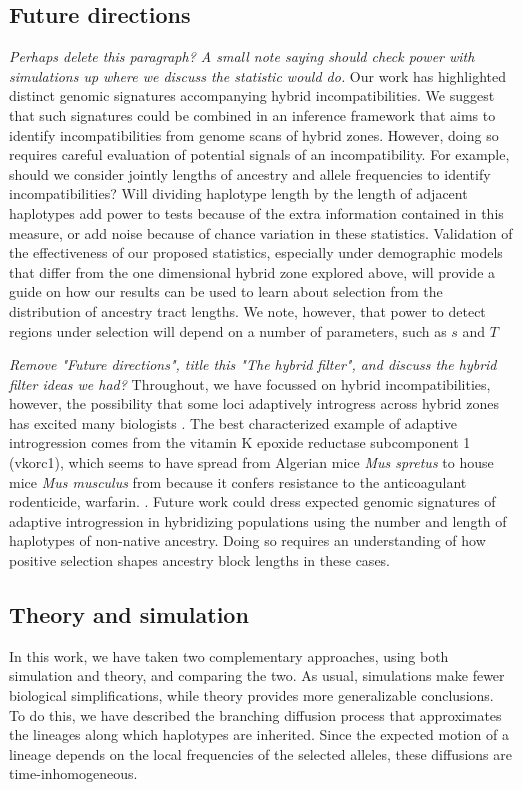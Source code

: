\documentclass[11pt,letterpaper]{article}
\newcommand{\plr}[1]{{\em \color{blue} #1}}
\begin{document}
\subsection*{Future directions}

\plr{Perhaps delete this paragraph? A small note saying should check power with simulations up where we discuss the statistic would do.}
Our work has highlighted distinct genomic signatures accompanying hybrid incompatibilities. 
We suggest that such signatures could be combined in an inference framework that aims to identify incompatibilities from genome scans of hybrid zones.  
However, doing so requires careful evaluation of potential signals of an incompatibility. 
For example, should we consider jointly lengths of ancestry and allele frequencies to identify incompatibilities?
Will dividing haplotype length by the length of adjacent haplotypes add power to tests because of the extra information contained in this measure, or add noise because of chance variation in these statistics.  
Validation of the effectiveness of our proposed statistics, especially under demographic models that differ from the one dimensional hybrid zone explored above, will  provide a guide on how our results can be used to learn about selection from the distribution of ancestry tract lengths. We note, however, that power to detect regions under selection will depend on a number of parameters, such as $s$ and $T$

\plr{Remove "Future directions", title this "The hybrid filter", and discuss the hybrid filter ideas we had?}
Throughout, we have focussed on hybrid incompatibilities, however, the possibility that some loci adaptively introgress across hybrid zones has excited many biologists \citep{Arnold2004}.   
The best characterized example of adaptive introgression comes from the vitamin K epoxide reductase subcomponent 1 (vkorc1), which seems to have spread from Algerian mice \emph{Mus spretus} to house mice \emph{Mus musculus} from because it confers resistance to the anticoagulant rodenticide, warfarin. \citep{Song2011}. 
Future work could dress expected genomic signatures of adaptive introgression in hybridizing populations using the number and length of haplotypes of non-native ancestry. 
Doing so requires an understanding of how positive selection shapes ancestry block lengths in these cases. 



\subsection*{Theory and simulation}
In this work, we have taken two complementary approaches,
using both simulation and theory, and comparing the two.
As usual, simulations make fewer biological simplifications,
while theory provides more generalizable conclusions.
To do this, we have described the branching diffusion process that approximates
the lineages along which haplotypes are inherited.
Since the expected motion of a lineage depends on the local frequencies of the selected alleles,
these diffusions are time-inhomogeneous.
\end{document}
